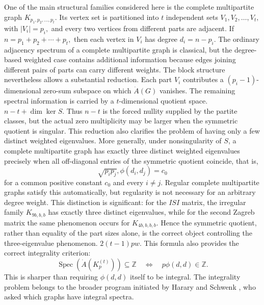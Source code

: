 \documentclass[12pt,twoside]{article}
\newcommand{\spec}{\operatorname{Spec}}
\begin{document}
One of the main structural families considered here is the complete multipartite graph
$
K_{p_1,p_2,\ldots,p_t}.
$
Its vertex set is partitioned into $t$ independent sets
$
V_1,V_2,\ldots,V_t,
$ with $ |V_i|=p_i, $
and every two vertices from different parts are adjacent. If
$
n=p_1+p_2+\cdots+p_t,
$
then each vertex in $V_i$ has degree
$
d_i=n-p_i.
$
The ordinary adjacency spectrum of a complete multipartite graph is classical, but the degree-based weighted case contains additional information because edges joining different pairs of parts can carry different weights. The block structure nevertheless allows a substantial reduction. Each part $V_i$ contributes a $(p_i-1)$-dimensional zero-sum subspace on which $\dot A(G)$ vanishes. The remaining spectral information is carried by a $t$-dimensional quotient space.
$
n-t+\dim\ker S.
$
Thus $n-t$ is the forced nullity supplied by the partite classes, but the actual zero multiplicity may be larger when the symmetric quotient is singular. 
This reduction also clarifies the problem of having only a few distinct weighted eigenvalues.  More generally, under nonsingularity of $S$, a complete multipartite graph has exactly three distinct weighted eigenvalues precisely when all off-diagonal entries of the symmetric quotient coincide, that is,
$$
\sqrt{p_ip_j},\phi(d_i,d_j)=c_0
$$
for a common positive constant $c_0$ and every $i\neq j$. Regular complete multipartite graphs satisfy this automatically, but regularity is not necessary for an arbitrary degree weight. This distinction is significant: for the $ISI$ matrix, the irregular family $K_{9b,b,b}$ has exactly three distinct eigenvalues, while for the second Zagreb matrix the same phenomenon occurs for $K_{4b,b,b,b}$. Hence the symmetric quotient, rather than equality of the part sizes alone, is the correct object controlling the three-eigenvalue phenomenon.
$
2(t-1)pw.
$
This formula also provides the correct integrality criterion:
$$
\spec(\dot A(K_p^{(t)}))\subseteq\mathbb Z
\quad\Longleftrightarrow\quad
p\phi(d,d)\in\mathbb Z.
$$
This is sharper than requiring $\phi(d,d)$ itself to be integral. The integrality problem belongs to the broader program initiated by Harary and Schwenk \cite{harary}, who asked which graphs have integral spectra.
\end{document}
